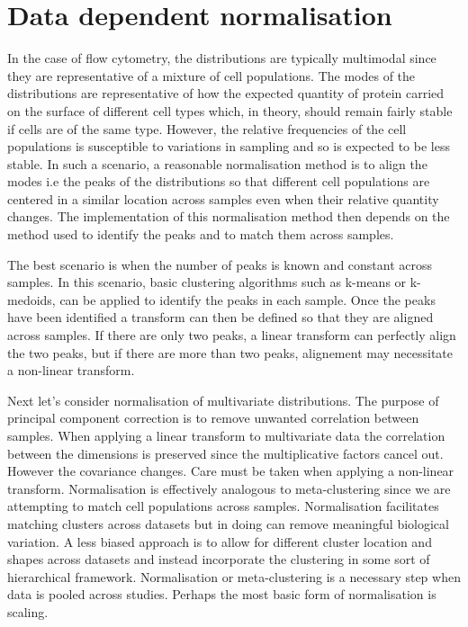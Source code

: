 \section{Data dependent normalisation}

In the case of flow cytometry, the distributions are typically multimodal since they are representative of a mixture of cell populations.
The modes of the distributions are representative of how the expected quantity of protein carried on the surface of different cell types which,
in theory, should remain fairly stable if cells are of the same type.
However, the relative frequencies of the cell populations is susceptible to variations in sampling and so is expected to be less stable.
In such a scenario, a reasonable normalisation method is to align the modes i.e the peaks of the distributions so that different cell populations are centered
in a similar location across samples even when their relative quantity changes.
The implementation of this normalisation method then depends on the method used to identify the peaks and to match them across samples.

The best scenario is when the number of peaks is known and constant across samples.
In this scenario, basic clustering algorithms such as k-means or k-medoids, can be applied to identify the peaks in each sample.
Once the peaks have been identified a transform can then be defined so that they are aligned across samples.
If there are only two peaks, a linear transform can perfectly align the two peaks, but if there are more than two peaks, alignement may necessitate a non-linear transform.

Next let's consider normalisation of multivariate distributions.  
The purpose of principal component correction is to remove unwanted correlation between samples.
When applying a linear transform to multivariate data the correlation between the dimensions is preserved since the multiplicative factors cancel out.
However the covariance changes.
Care must be taken when applying a non-linear transform.  
Normalisation is effectively analogous to meta-clustering since we are attempting to match cell populations across samples.  
Normalisation facilitates matching clusters across datasets but in doing can remove meaningful biological variation.  
A less biased approach is to allow for different cluster location and shapes across datasets and instead incorporate the clustering in some sort of hierarchical framework.  
Normalisation or meta-clustering is a necessary step when data is pooled across studies.
Perhaps the most basic form of normalisation is scaling.

